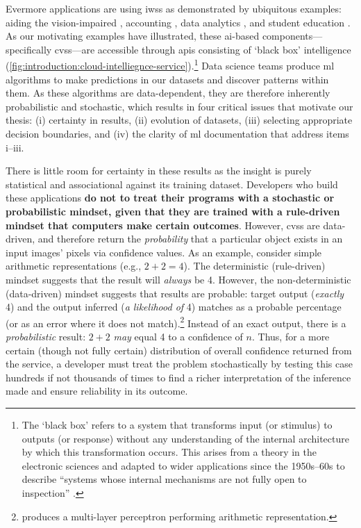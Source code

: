 Evermore applications are using \glspl{iws} as demonstrated by ubiquitous examples: aiding the vision-impaired \citep{Reis:2018cp,daMotaSilveira:2017vp}, accounting  \citep{Marshall:2018uj}, data analytics \citep{Iyengar:2017fb}, and student education \citep{Dibia:2017iy}.
As our motivating examples have illustrated, these \gls{ai}-based components---specifically \glspl{cvs}---are accessible through \glspl{api} consisting of `black box' intelligence (\cref{fig:introduction:cloud-intelliegnce-service}).\footnote{The `black box' refers to a system that transforms input (or stimulus)  to outputs (or response) without any understanding of the internal architecture by which this transformation occurs. This arises from a theory in the electronic sciences and adapted to wider applications since the 1950s--60s \citep{Ashby:1957db,Bunge:1963jm} to describe ``systems whose internal mechanisms are not fully open to inspection'' \citep{Ashby:1957db}. }
Data science teams produce \gls{ml} algorithms to make predictions in our datasets and discover patterns within them. As these algorithms are data-dependent, they are therefore inherently probabilistic and stochastic, which results in four critical issues that motivate our thesis: (i) certainty in results, (ii) evolution of datasets, (iii) selecting appropriate decision boundaries, and (iv) the clarity of \gls{ml} documentation that address items i--iii.

There is little room for certainty in these results as the insight is purely statistical and associational \citep{Pearl:2018uv} against its training dataset. Developers who build these applications \textbf{do not to treat their programs with a stochastic or probabilistic mindset, given that they are trained with a rule-driven mindset that computers make certain outcomes}. 
However, \glspl{cvs} are data-driven, and therefore return the \textit{probability} that a particular object exists in an input images' pixels via confidence values.
As an example, consider simple arithmetic representations (e.g., $2+2=4$). The deterministic (rule-driven) mindset suggests that the result will \textit{always} be 4. However, the non-deterministic (data-driven) mindset suggests that results are probable: target output (\textit{exactly} 4) and the output inferred (\textit{a likelihood of} 4) matches as a probable percentage (or as an error where it does not match).\footnote{\citet{Blake:1998vd} produces a multi-layer perceptron  performing arithmetic representation.} Instead of an exact output, there is a \textit{probabilistic} result: $2+2$ \textit{may} equal 4 to a confidence of $n$. 
Thus, for a more certain (though not fully certain) distribution of overall confidence returned from the service, a developer must treat the problem stochastically by testing this case hundreds if not thousands of times to find a richer interpretation of the inference made and ensure reliability in its outcome.

